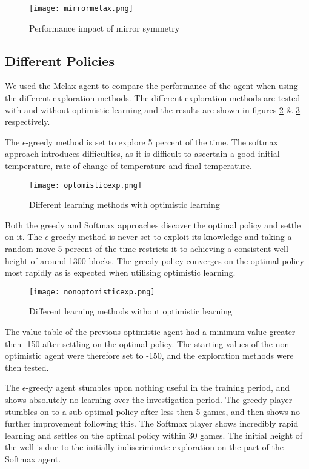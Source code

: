 \documentclass{rucsthesis}
\begin{document}
\begin{figure}[h]
\centering
\texttt{[image: mirrormelax.png]}
\caption{Performance impact of mirror symmetry}
\label{fig:comparemelax}
\end{figure}

\subsection{Different Policies}

We used the Melax agent to compare the performance of the agent when using the different exploration methods. The different exploration methods are tested with and without optimistic learning and the results are shown in figures \ref{fig:compexpopt} \& \ref{fig:compexp} respectively.

The $\epsilon$-greedy method is set to explore 5 percent of the time. The softmax approach introduces difficulties, as it is difficult to ascertain a good initial temperature, rate of change of temperature and final temperature.

\begin{figure}[h]
\centering
\texttt{[image: optomisticexp.png]}
\caption{Different learning methods with optimistic learning}
\label{fig:compexpopt}
\end{figure}

Both the greedy and Softmax approaches discover the optimal policy and settle on it. The $\epsilon$-greedy method is never set to exploit its knowledge and taking a random move 5 percent of the time restricts it to achieving a consistent well height of around 1300 blocks. The greedy policy converges on the optimal policy most rapidly as is expected when utilising optimistic learning.

\begin{figure}[h]
\centering
\texttt{[image: nonoptomisticexp.png]}
\caption{Different learning methods without optimistic learning}
\label{fig:compexp}
\end{figure}

The value table of the previous optimistic agent had a minimum value greater then -150 after settling on the optimal policy. The starting values of the non-optimistic agent were therefore set to -150, and the exploration methods were then tested. 

The $\epsilon$-greedy agent stumbles upon nothing useful in the training period, and shows absolutely no learning over the investigation period. The greedy player stumbles on to a sub-optimal policy after less then 5 games, and then shows no further improvement following this. The Softmax player shows incredibly rapid learning and settles on the optimal policy within 30 games. The initial height of the well is due to the initially indiscriminate exploration on the part of the Softmax agent.
\end{document}
